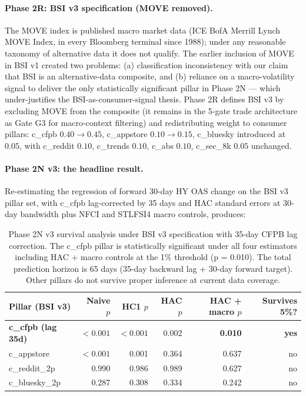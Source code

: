 \documentclass[11pt,a4paper]{article}
\begin{document}
\paragraph{Phase 2R: BSI v3 specification (MOVE removed).} The MOVE index is published macro market data (ICE BofA Merrill Lynch MOVE Index, in every Bloomberg terminal since 1988); under any reasonable taxonomy of alternative data it does not qualify. The earlier inclusion of MOVE in BSI v1 created two problems: (a) classification inconsistency with our claim that BSI is an alternative-data composite, and (b) reliance on a macro-volatility signal to deliver the only statistically significant pillar in Phase 2N --- which under-justifies the BSI-as-consumer-signal thesis. Phase 2R defines BSI v3 by excluding MOVE from the composite (it remains in the 5-gate trade architecture as Gate G3 for macro-context filtering) and redistributing weight to consumer pillars: c\_cfpb $0.40 \to 0.45$, c\_appstore $0.10 \to 0.15$, c\_bluesky introduced at $0.05$, with c\_reddit $0.10$, c\_trends $0.10$, c\_abs $0.10$, c\_sec\_8k $0.05$ unchanged.

\paragraph{Phase 2N v3: the headline result.} Re-estimating the regression of forward 30-day HY OAS change on the BSI v3 pillar set, with c\_cfpb lag-corrected by 35 days and HAC standard errors at 30-day bandwidth plus NFCI and STLFSI4 macro controls, produces:

\begin{table}[h]
\centering\footnotesize
\begin{tabular}{@{}lrrrrr@{}}
\toprule
\textbf{Pillar (BSI v3)} & \textbf{Naive $p$} & \textbf{HC1 $p$} & \textbf{HAC $p$} & \textbf{HAC + macro $p$} & \textbf{Survives 5\%?} \\
\midrule
\textbf{c\_cfpb (lag 35d)} & ${<}0.001$ & ${<}0.001$ & 0.002 & \textbf{0.010} & \textbf{yes} \\
c\_appstore     & ${<}0.001$ & 0.001 & 0.364 & 0.637 & no \\
c\_reddit\_2p    & 0.990    & 0.986 & 0.989 & 0.627 & no \\
c\_bluesky\_2p   & 0.287    & 0.308 & 0.334 & 0.242 & no \\
\bottomrule
\end{tabular}
\caption{Phase 2N v3 survival analysis under BSI v3 specification with 35-day CFPB lag correction. The c\_cfpb pillar is statistically significant under all four estimators including HAC + macro controls at the 1\% threshold (p = 0.010). The total prediction horizon is 65 days (35-day backward lag + 30-day forward target). Other pillars do not survive proper inference at current data coverage.}
\label{tab:phase2N_v3_survival}
\end{table}
\end{document}
